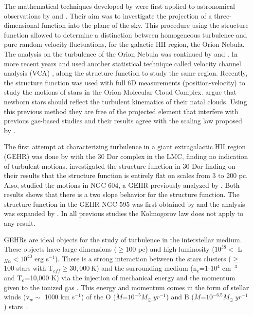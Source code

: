 \documentclass[fleqn,usenatbib]{mnras}
\begin{document}
The mathematical techniques developed by \citet{kolm1,heisenberg1951stability} were first applied to astronomical observations by \citet{von1951methode} and \citet{munch1958internal}. Their aim was to investigate the projection of a three-dimensional function into the plane of the sky. This procedure using the structure function allowed to determine a distinction between homogeneous turbulence and pure random velocity fluctuations, for the galactic HII region, the Orion Nebula. The analysis on the turbulence of the Orion Nebula was continued by \citet{castaneda1988} and \citet{1992ApJ...387..229O}. In more recent years \cite{medina2014} and \cite{arthur2016turbulence} used another statistical technique called velocity channel analysis (VCA) \citep{2000ApJ...537..720L}, along the structure function to study the same region. Recently, the structure function was used with full 6D measurements (position-velocity) to study the motions of stars in the Orion Molecular Cloud Complex. \cite{2021ApJ...907L..40H} argue that newborn stars should reflect the turbulent kinematics of their natal clouds. Using this previous method they are free of the projected element that interfere with previous gas-based studies and their results agree with the scaling law proposed by \cite{1981MNRAS.194..809L}.  

The first attempt at characterizing turbulence in a giant extragalactic HII region (GEHR) was done by \citet{1961MNRAS.122....1F} with the 30 Dor complex in the LMC, finding no indication of turbulent motions. \cite{2019arXiv191203543M} investigated the structure function in 30 Dor finding on their results that the structure function is entirely flat on scales from 3 to 200 pc. Also, \cite{2019arXiv191203543M} studied the motions in NGC 604, a GEHR previously analyzed by \cite{tanco1997}. Both results shows that there is a two slope behavior for the structure function. The structure function in the GEHR NGC 595 was first obtained by \cite{lagrois2009multi} and the analysis was expanded by \cite{lagrois2011}. In all previous studies the Kolmogorov law does not apply to any result.

GEHRs are ideal objects for the study of turbulence in the interstellar medium. These objects have large dimensions ($ \geq $100 pc) and high luminosity ($10^{38}<$ L$_{H\alpha}<10^{40}$ erg s$^{-1}$). There is a strong interaction between the stars clusters ($\geq$100 stars with T$_{eff}\geq30,000\ $K) and the surrounding medium (n$_{e}$=1-10$^4$ cm$^{-3}$ and T$_{e}$=10,000 K) via the injection of mechanical energy and the momentum given to the ionized gas \citep{castaneda1992density}. This energy and momentum comes in the form of stellar winds (v$_{w}\sim$ 1000 km s$^{-1}$) of the O ($\dot{M}$=$10^{-5} M_{\odot}\ yr^{-1}$) and B ($\dot{M}$=$10^{-6.5} M_{\odot}\ yr^{-1}$) stars \citep{dyson1979}.
\end{document}
